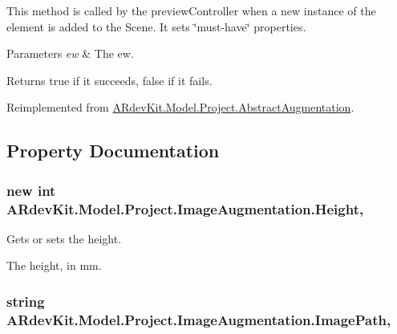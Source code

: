 This method is called by the preview\-Controller when a new instance of the element is added to the Scene. It sets \char`\"{}must-\/have\char`\"{} properties. 


\begin{DoxyParams}{Parameters}
{\em ew} & The ew.\\
\hline
\end{DoxyParams}
\begin{DoxyReturn}{Returns}
true if it succeeds, false if it fails. 
\end{DoxyReturn}


Reimplemented from \hyperlink{class_a_rdev_kit_1_1_model_1_1_project_1_1_abstract_augmentation_a8b02a2eb775b8147e71575694ce8a38f}{A\-Rdev\-Kit.\-Model.\-Project.\-Abstract\-Augmentation}.



\subsection{Property Documentation}
\hypertarget{class_a_rdev_kit_1_1_model_1_1_project_1_1_image_augmentation_a5cecd83037a573b7f4fdfc7ebe6c7476}{
\subsubsection[{Height}]{\setlength{\rightskip}{0pt plus 5cm}new int A\-Rdev\-Kit.\-Model.\-Project.\-Image\-Augmentation.\-Height\hspace{0.3cm}{\ttfamily [get]}, {\ttfamily [set]}}}\label{class_a_rdev_kit_1_1_model_1_1_project_1_1_image_augmentation_a5cecd83037a573b7f4fdfc7ebe6c7476}


Gets or sets the height. 

The height, in mm. \hypertarget{class_a_rdev_kit_1_1_model_1_1_project_1_1_image_augmentation_a499cb36152832a4dd29794e3c1dd2718}{
\subsubsection[{Image\-Path}]{\setlength{\rightskip}{0pt plus 5cm}string A\-Rdev\-Kit.\-Model.\-Project.\-Image\-Augmentation.\-Image\-Path\hspace{0.3cm}{\ttfamily [get]}, {\ttfamily [set]}}}\label{class_a_rdev_kit_1_1_model_1_1_project_1_1_image_augmentation_a499cb36152832a4dd29794e3c1dd2718}


